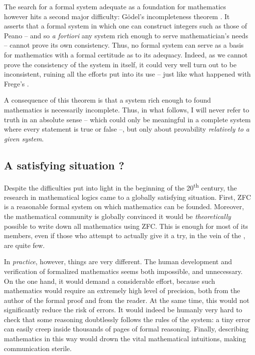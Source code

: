 The search for a formal system adequate as a foundation for mathematics however hits a
second major difficulty: Gödel’s incompleteness theorem . It asserts
that a formal system in which one can construct integers such as those of Peano – and so
\textit{a fortiori} any system rich enough to serve mathematician’s needs – cannot
prove its own consistency. Thus, no formal system can serve as a basis for mathematics
with a formal certitude as to its adequacy.
Indeed, as we cannot prove the consistency of the system in itself, it could very well
turn out to be inconsistent, ruining all the efforts put into its use – just like what
happened with Frege’s .

A consequence of this theorem is that a system rich enough to found mathematics is
necessarily incomplete.%
Thus, in what follows, I will never refer to truth in an absolute sense – which could
only be meaningful in a complete system where every statement is true or false –, but
only about provability \emph{relatively to a given system}.

\subsection{A satisfying situation ?}

Despite the difficulties put into light in the beginning of the 20\textsuperscript{th}
century, the research in mathematical logics came to a globally satisfying situation.
First, ZFC is a reasonable formal system on which mathematics can be founded. Moreover,
the mathematical community is globally convinced it would be \emph{theoretically} possible
to write down all mathematics using ZFC. This is enough for most of its members,
even if those who attempt to actually give it a try, in the vein of the
, are quite few.

In \emph{practice}, however, things are very different. The human development and
verification of formalized mathematics%
seems both impossible, and unnecessary.
On the one hand, it would demand a considerable effort, because such mathematics would
require an extremely high level of precision, both from the author of the formal proof
and from the reader. At the same time, this would not significantly reduce the risk of
errors. It would indeed be humanly very hard to check that some reasoning doubtlessly
follows the rules of the system: a tiny error can easily creep inside thousands of pages
of formal reasoning. Finally, describing mathematics in this way would drown the vital
mathematical intuitions, making communication sterile.

